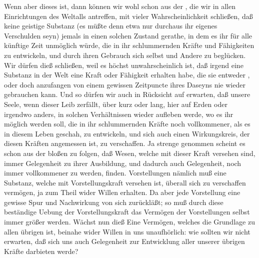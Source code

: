 \begin{aufza}
\item Wenn aber dieses ist, dann können wir wohl schon aus der , die wir in allen Einrichtungen des Weltalls antreffen, mit vieler Wahrscheinlichkeit schließen, daß keine geistige Substanz (es müßte denn etwa nur durchaus ihr eigenes Verschulden seyn) jemals in einen solchen Zustand gerathe, in dem es ihr für alle künftige Zeit unmöglich würde, die in ihr schlummernden Kräfte und Fähigkeiten zu entwickeln, und durch ihren Gebrauch sich selbst und Andere zu beglücken. Wir dürfen dieß schließen, weil es höchst unwahrscheinlich ist, daß irgend eine Substanz in der Welt eine Kraft oder Fähigkeit erhalten habe, die sie entweder , oder doch anzufangen von einem gewissen Zeitpuncte ihres Daseyns nie wieder gebrauchen kann. Und so dürfen wir auch in Rücksicht auf  erwarten, daß unsere Seele, wenn dieser Leib zerfällt, über kurz oder lang, hier auf Erden oder irgendwo anders, in solchen Verhältnissen wieder aufleben werde, wo es ihr möglich werden soll, die in ihr schlummernden Kräfte noch vollkommener, als es in diesem Leben geschah, zu entwickeln, und sich auch einen Wirkungskreis, der diesen Kräften angemessen ist, zu verschaffen. Ja strenge genommen scheint es schon aus der bloßen  zu folgen, daß Wesen, welche mit dieser Kraft versehen sind, immer Gelegenheit zu ihrer Ausbildung, und dadurch auch Gelegenheit, noch immer vollkommener zu werden, finden. Vorstellungen nämlich muß eine Substanz, welche mit Vorstellungskraft versehen ist, überall sich zu verschaffen vermögen, ja zum Theil wider Willen erhalten. Da aber jede Vorstellung eine gewisse Spur und Nachwirkung von sich zurückläßt; so muß durch diese beständige Uebung der Vorstellungskraft das Vermögen der Vorstellungen selbst immer größer werden. Wächst nun dieß Eine Vermögen, welches die Grundlage zu allen übrigen ist, beinahe wider Willen in uns unaufhörlich: wie sollten wir nicht erwarten, daß sich uns auch Gelegenheit zur Entwicklung aller unserer übrigen Kräfte darbieten werde?

\end{aufza}
